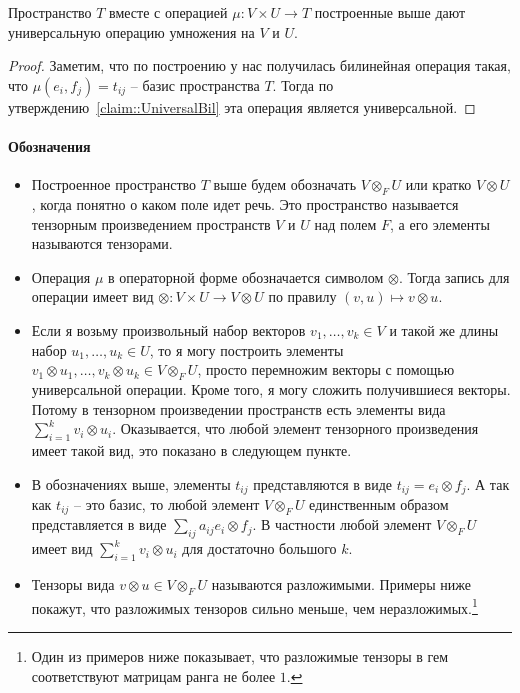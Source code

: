 \begin{claim*}
Пространство $T$ вместе с операцией $\mu\colon V\times U\to T$ построенные выше дают универсальную операцию умножения на $V$ и $U$.
\end{claim*}
\begin{proof}
Заметим, что по построению у нас получилась билинейная операция такая, что $\mu(e_i, f_j) = t_{ij}$ -- базис пространства $T$. Тогда по утверждению~\ref{claim::UniversalBil} эта операция является универсальной.
\end{proof}

\paragraph{Обозначения}
\begin{itemize}
\item Построенное пространство $T$ выше будем обозначать $V\otimes_F U$ или кратко $V\otimes U$, когда понятно о каком поле идет речь. Это пространство называется тензорным произведением пространств $V$ и $U$ над полем $F$, а его элементы называются тензорами.

\item Операция $\mu$ в операторной форме обозначается символом $\otimes$. Тогда запись для операции имеет вид $\otimes \colon V\times U \to V\otimes U$ по правилу $(v,u) \mapsto v\otimes u$.

\item Если я возьму произвольный набор векторов $v_1,\ldots,v_k\in V$ и такой же длины набор $u_1,\ldots, u_k\in U$, то я могу построить элементы $v_1\otimes u_1,\ldots, v_k\otimes u_k\in V\otimes_F U$, просто перемножим векторы с помощью универсальной операции. Кроме того, я могу сложить получившиеся векторы. Потому в тензорном произведении пространств есть элементы вида $\sum_{i=1}^k v_i \otimes u_i$. Оказывается, что любой элемент тензорного произведения имеет такой вид, это показано в следующем пункте.

\item В обозначениях выше, элементы $t_{ij}$ представляются в виде $t_{ij} = e_i \otimes f_j$. А так как $t_{ij}$ -- это базис, то любой элемент $V\otimes_F U$ единственным образом представляется в виде $\sum_{ij}a_{ij}e_i\otimes f_j$. В частности любой элемент $V\otimes_F U$ имеет вид $\sum_{i=1}^k v_i\otimes u_i$ для достаточно большого $k$.

\item Тензоры вида $v\otimes u\in V\otimes_F U$ называются разложимыми. Примеры ниже покажут, что разложимых тензоров сильно меньше, чем неразложимых.\footnote{Один из примеров ниже показывает, что разложимые тензоры в гем соответствуют матрицам ранга не более $1$.}

\end{itemize}

